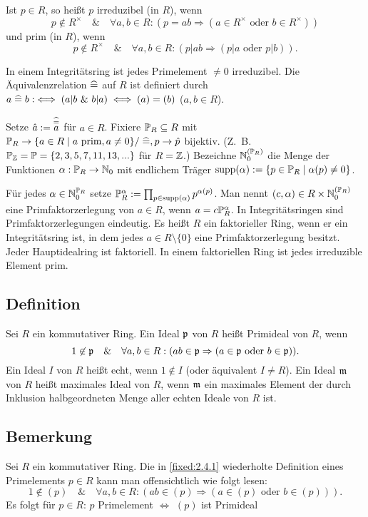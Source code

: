 Ist $p \in R$, so heißt $p$ irreduzibel (in $R$), wenn
$$p \not\in R^\times \quad \& \quad \forall a,b \in R : (p = ab \Rightarrow (a \in R^\times \text{ oder } b \in R^\times))$$
und prim (in $R$), wenn
$$p \not\in R^\times \quad \& \quad \forall a,b \in R: (p|ab \Rightarrow (p|a \text{ oder } p|b)).$$

In einem Integritätsring ist jedes Primelement $\neq 0$ irreduzibel. Die Äquivalenzrelation $\eqhat$ auf $R$ ist definiert durch $a \eqhat b :\iff (a|b \text{ \& } b|a) \iff (a) = (b)$ ($a,b \in R$).

Setze $\hat a := \overset{\eqhat}{a}$ für $a \in R$. Fixiere $\P_R \subseteq R$ mit $\P_R \to \{a \in R \mid a \text{ prim}, a \neq 0\}/\eqhat, p \to \hat p$ bijektiv. (Z.~B.~$\P_\Z = \P = \{2,3,5,7,11,13,...\}$ für $R = \Z$.) Bezeichne $\N_0^{(\P_R)}$ die Menge der Funktionen $\alpha: \P_R \to \N_0$ mit endlichem Träger $\supp(\alpha) := \{p \in \P_R \mid \alpha(p) \neq 0\}$.

Für jedes $\alpha \in \N_0^{\P_R}$ setze $\P_R^\alpha := \prod_{p \in \supp(\alpha)} p^{\alpha(p)}$. Man nennt $(c,\alpha) \in R \times \N_0^{(\P_R)}$ eine Primfaktorzerlegung von $a \in R$, wenn $a = c \P_R^\alpha$. In Integritätsringen sind Primfaktorzerlegungen eindeutig. Es heißt $R$ ein faktorieller Ring, wenn er ein Integritätsring ist, in dem jedes $a \in R\setminus\{0\}$ eine Primfaktorzerlegung besitzt. Jeder Hauptidealring ist faktoriell. In einem faktoriellen Ring ist jedes irreduzible Element prim. \cite[§ 2.4]{Bosch2004}

\subsection{Definition} Sei $R$ ein kommutativer Ring. Ein Ideal $\p$ von $R$ heißt Primideal von $R$, wenn
$$1 \not\in \p \quad \& \quad \forall a,b \in R : (ab \in \p \Rightarrow (a \in \p \text{ oder } b \in \p)).$$
Ein Ideal $I$ von $R$ heißt echt, wenn $1 \not\in I$ (oder äquivalent $I \neq R$). Ein Ideal $\m$ von $R$ heißt maximales Ideal von $R$, wenn $\m$ ein maximales Element der durch Inklusion halbgeordneten Menge aller echten Ideale von $R$ ist.

\subsection{Bemerkung} \label{fixed:2.4.3} Sei $R$ ein kommutativer Ring. Die in \ref{fixed:2.4.1} wiederholte Definition eines Primelements $p \in R$ kann man offensichtlich wie folgt lesen:
$$1 \not\in (p) \quad \& \quad \forall a,b \in R : (ab \in (p) \Rightarrow (a \in (p) \text{ oder } b \in (p))).$$
Es folgt für $p \in R$: $p$ Primelement $\iff$ $(p)$ ist Primideal

